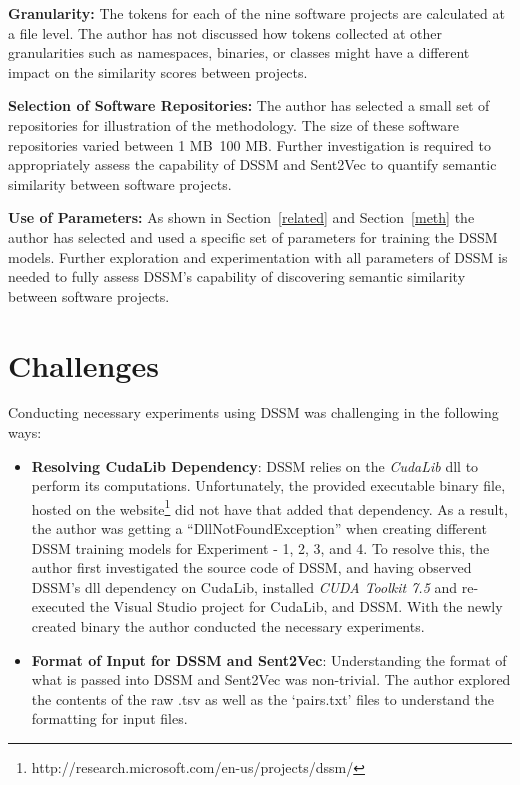 \documentclass[conference]{IEEEtran}
\begin{document}
\textbf{Granularity:} The tokens for each of the nine software projects are calculated at a file level. The author has not discussed how tokens collected at other granularities such as namespaces, binaries, or classes might have a different impact on the similarity scores between projects. 

\textbf{Selection of Software Repositories:} The author has selected a small set of repositories for illustration of the methodology. The size of these software repositories varied between 1 MB~100 MB. Further investigation is required to appropriately assess the capability of DSSM and Sent2Vec to quantify semantic similarity between software projects. 

\textbf{Use of Parameters:} As shown in Section~\ref{related} and Section~\ref{meth} the author has selected and used a specific set of parameters for training the DSSM models. Further exploration and experimentation with all parameters of DSSM is needed to fully assess DSSM's capability of discovering semantic similarity between software projects.       
 

\section{Challenges}
\label{challenges}
Conducting necessary experiments using DSSM was challenging in the following ways: 

\begin{itemize}
\item{\textbf{Resolving CudaLib Dependency}: DSSM relies on the \textit{CudaLib} dll to perform its computations. Unfortunately, the provided executable binary file, hosted on the website\footnote{http://research.microsoft.com/en-us/projects/dssm/} did not have that added that dependency. As a result, the author was getting a ``DllNotFoundException'' when creating different DSSM training models for Experiment - 1, 2, 3, and 4. To resolve this, the author first investigated the source code of DSSM, and having observed DSSM's dll dependency on CudaLib, installed \textit{CUDA Toolkit 7.5} and re-executed the Visual Studio project for CudaLib, and DSSM. With the newly created binary the author conducted the necessary experiments.  }

\item{\textbf{Format of Input for DSSM and Sent2Vec}: Understanding the format of what is passed into DSSM and Sent2Vec was non-trivial. The author explored the contents of the raw .tsv as well as the `pairs.txt' files to understand the formatting for input files.}
\end{itemize}  
\end{document}
